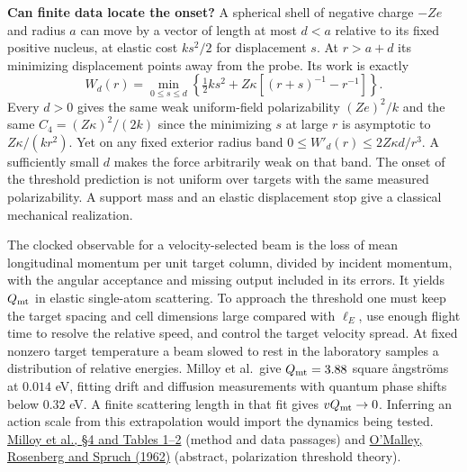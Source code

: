 \documentclass[11pt,a4paper]{article}
\begin{document}
\textbf{Can finite data locate the onset?} A spherical shell of negative
charge \(-Ze\) and radius \(a\) can move by a vector of length at most
\(d<a\) relative to its fixed positive nucleus, at elastic cost
\(ks^2/2\) for displacement \(s\). At \(r>a+d\) its minimizing
displacement points away from the probe. Its work is exactly \[
 W_d(r)=\min_{0\le s\le d}\left\{\tfrac12ks^2+
 Z\kappa[(r+s)^{-1}-r^{-1}]\right\}.
\] Every \(d>0\) gives the same weak uniform-field polarizability
\((Ze)^2/k\) and the same \(C_4=(Z\kappa)^2/(2k)\) since the minimizing
\(s\) at large \(r\) is asymptotic to \(Z\kappa/(kr^2)\). Yet on any
fixed exterior radius band \(0\le W'_d(r)\le2Z\kappa d/r^3\). A
sufficiently small \(d\) makes the force arbitrarily weak on that band.
The onset of the threshold prediction is not uniform over targets with
the same measured polarizability. A support mass and an elastic
displacement stop give a classical mechanical realization.

The clocked observable for a velocity-selected beam is the loss of mean
longitudinal momentum per unit target column, divided by incident
momentum, with the angular acceptance and missing output included in its
errors. It yields \(Q_{\rm mt}\) in elastic single-atom scattering. To
approach the threshold one must keep the target spacing and cell
dimensions large compared with \(\ell_E\), use enough flight time to
resolve the relative speed, and control the target velocity spread. At
fixed nonzero target temperature a beam slowed to rest in the laboratory
samples a distribution of relative energies. Milloy et al.~give
\(Q_{\rm mt}=3.88\) square ångströms at \(0.014\) eV, fitting drift and
diffusion measurements with quantum phase shifts below \(0.32\) eV. A
finite scattering length in that fit gives \(vQ_{\rm mt}\to0\).
Inferring an action scale from this extrapolation would import the
dynamics being tested.
\href{https://www.publish.csiro.au/ph/pdf/PH770061}{Milloy et al., §4
and Tables 1--2} (method and data passages) and
\href{https://doi.org/10.1103/PhysRev.125.1300}{O'Malley, Rosenberg and
Spruch (1962)} (abstract, polarization threshold theory).
\end{document}

